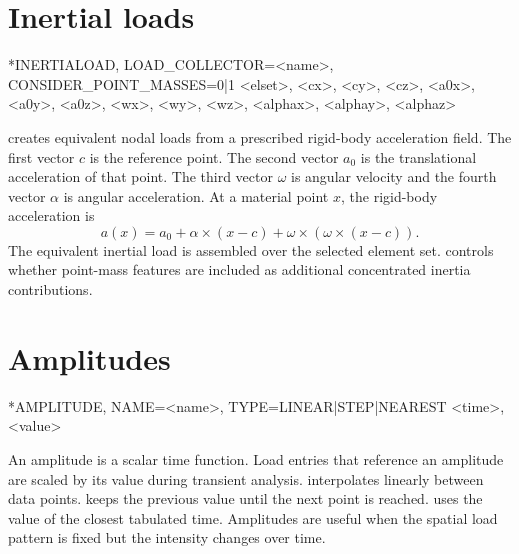 \section{Inertial loads}

\begin{syntax}
*INERTIALOAD, LOAD_COLLECTOR=<name>, CONSIDER_POINT_MASSES=0|1
<elset>, <cx>, <cy>, <cz>, <a0x>, <a0y>, <a0z>, <wx>, <wy>, <wz>, <alphax>, <alphay>, <alphaz>
\end{syntax}

 creates equivalent nodal loads from a prescribed rigid-body acceleration field. The first vector \(c\) is the reference point. The second vector \(a_0\) is the translational acceleration of that point. The third vector \(\omega\) is angular velocity and the fourth vector \(\alpha\) is angular acceleration. At a material point \(x\), the rigid-body acceleration is
\[
a(x) = a_0 + \alpha \times (x-c) + \omega \times \left(\omega \times (x-c)\right).
\]
The equivalent inertial load is assembled over the selected element set.  controls whether point-mass features are included as additional concentrated inertia contributions.

\section{Amplitudes}

\begin{syntax}
*AMPLITUDE, NAME=<name>, TYPE=LINEAR|STEP|NEAREST
<time>, <value>
\end{syntax}

An amplitude is a scalar time function. Load entries that reference an amplitude are scaled by its value during transient analysis.  interpolates linearly between data points.  keeps the previous value until the next point is reached.  uses the value of the closest tabulated time. Amplitudes are useful when the spatial load pattern is fixed but the intensity changes over time.
